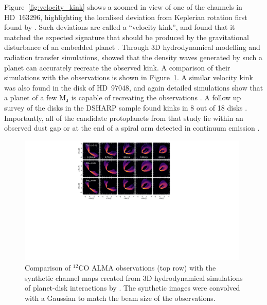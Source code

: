 Figure~\ref{fig:velocity_kink} shows a zoomed in view of one of the channels in HD~163296, highlighting the localised deviation from Keplerian rotation first found by \citet{pinte2018a}.
Such deviations are called a ``velocity kink'', and \citet{pinte2018a} found that it matched the expected signature that should be produced by the gravitational disturbance of an embedded planet \citep{perez2015}.
Through 3D hydrodynamical modelling and radiation transfer simulations, \citet{pinte2018a} showed that the density waves generated by such a planet can accurately recreate the observed kink.
A comparison of their simulations with the observations is shown in Figure~\ref{fig:pinte2018_hydro}.
A similar velocity kink was also found in the disk of HD~97048, and again detailed simulations show that a planet of a few $\mathrm{M_J}$ is capable of recreating the observations \citep{pinte2019}.
A follow up survey of the disks in the DSHARP sample found kinks in 8 out of 18 disks \citep{pinte2020}.
Importantly, all of the candidate protoplanets from that study lie within an observed dust gap or at the end of a spiral arm detected in continuum emission \citep{huang2018b,huang2018,pinte2020}.

\begin{figure}
    \centering
    \includegraphics[width = 0.98\textwidth]{figures/pinte_2018_sims_channels.pdf}
    \caption{Comparison of $^{12}$CO ALMA observations (top row) with the synthetic channel maps created from 3D hydrodynamical simulations of planet-disk interactions by \citet{pinte2018a}. The synthetic images were convolved with a Gaussian to match the beam size of the observations.}
    \label{fig:pinte2018_hydro}
\end{figure}

